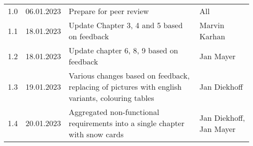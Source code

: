 \begin{footnotesize}
\begin{longtable}[L L L L]{ p{} p{} p{} p{} }
    \rowcolor{Gray}
    1.0              & 06.01.2023    & Prepare for peer review                                                                                                                       & All             \\
    
    1.1              & 18.01.2023    & Update Chapter 3, 4 and 5 based on feedback                                                                                                   & Marvin Karhan   \\

    \rowcolor{Gray}
    1.2              & 18.01.2023    & Update chapter 6, 8, 9 based on feedback                                                                             & Jan Mayer    \\

    1.3              & 19.01.2023    & Various changes based on feedback, replacing of pictures with english variants, colouring tables                                              & Jan Diekhoff    \\
    \rowcolor{Gray}
    1.4              & 20.01.2023    & Aggregated non-functional requirements into a single chapter with snow cards                                                                  & Jan Diekhoff, Jan Mayer    \\
    \bottomrule
  \end{longtable}
\end{footnotesize}
\rmfamily